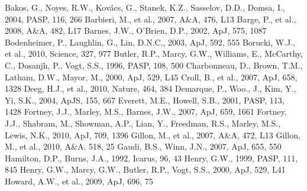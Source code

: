 \documentclass[12pt,preprint]{emulateapj}
\begin{document}
\begin{thebibliography}{}
 Bakos,
  G., Noyes, R.W., Kov\'acs, G., Stanek, K.Z., Sasselov, D.D., Domsa,
  I., 2004, PASP, 116, 266
  Barbieri, M., et al., 2007, A\&A, 476, L13
  Barge, P., et al., 2008, A\&A, 482, L17
  Barnes, J.W., O'Brien, D.P., 2002, ApJ, 575, 1087
  Bodenheimer, P., Laughlin, G., Lin, D.N.C., 2003, ApJ, 592, 555
  Borucki, W.J., et al., 2010, Science, 327, 977
 Butler,
  R.P., Marcy, G.W., Williams, E., McCarthy, C., Dosanjh, P., Vogt,
  S.S., 1996, PASP, 108, 500
  Charbonneau, D., Brown, T.M., Latham, D.W., Mayor, M., 2000, ApJ,
  529, L45
 Croll,
  B., et al., 2007, ApJ, 658, 1328
  Deeg, H.J., et al., 2010, Nature, 464, 384
  Demarque, P., Woo., J., Kim, Y., Yi, S.K., 2004, ApJS, 155, 667
  Everett, M.E., Howell, S.B., 2001, PASP, 113, 1428
  Fortney, J.J., Marley, M.S., Barnes, J.W., 2007, ApJ, 659, 1661
  Fortney, J.J., Shabram, M., Showman, A.P., Lian, Y., Freedman,
  R.S., Marley, M.S., Lewis, N.K., 2010, ApJ, 709, 1396
 Gillon,
  M., et al., 2007, A\&A, 472, L13
 Gillon,
  M., et al., 2010, A\&A, 518, 25
 Gaudi,
  B.S., Winn, J.N., 2007, ApJ, 655, 550
  Hamilton, D.P., Burns, J.A., 1992, Icarus, 96, 43
 Henry, G.W.,
  1999, PASP, 111, 845
 Henry,
  G.W., Marcy, G.W., Butler, R.P., Vogt, S.S., 2000, ApJ, 529, L41
  Howard, A.W., et al., 2009, ApJ, 696, 75

\end{thebibliography}
\end{document}
